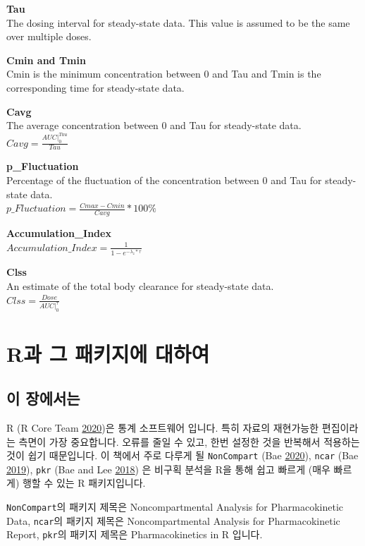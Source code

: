 \documentclass[
  12pt,
]{krantz}
\begin{document}
\textbf{Tau}\\
The dosing interval for steady-state data. This value is assumed to be the same over multiple doses.

\textbf{Cmin and Tmin}\\
Cmin is the minimum concentration between 0 and Tau and Tmin is the corresponding time for steady-state data.

\textbf{Cavg}\\
The average concentration between 0 and Tau for steady-state data.\\
\(Cavg = \frac{AUC|_{0}^{Tau}}{Tau}\)

\textbf{p\_Fluctuation}\\
Percentage of the fluctuation of the concentration between 0 and Tau for steady-state data.\\
\(p\_Fluctuation = \frac{Cmax-Cmin}{Cavg}*100\%\)

\textbf{Accumulation\_Index}\\
\(Accumulation\_Index = \frac{1}{1-e^{-\lambda_{z}*\tau}}\)

\textbf{Clss}\\
An estimate of the total body clearance for steady-state data.\\
\(Clss = \frac{Dose}{AUC|_{0}^{\tau}}\)

\hypertarget{R-and-packages}{%
\chapter{R과 그 패키지에 대하여}\label{R-and-packages}}

\hypertarget{summary-r-packages}{%
\section{이 장에서는}\label{summary-r-packages}}

R (R Core Team \protect\hyperlink{ref-R-base}{2020})은 통계 소프트웨어 입니다.
특히 자료의 재현가능한 편집이라는 측면이 가장 중요합니다. 오류를 줄일 수 있고, 한번 설정한 것을 반복해서 적용하는 것이 쉽기 때문입니다.
이 책에서 주로 다루게 될 \texttt{NonCompart} (Bae \protect\hyperlink{ref-R-NonCompart}{2020}), \texttt{ncar} (Bae \protect\hyperlink{ref-R-ncar}{2019}), \texttt{pkr} (Bae and Lee \protect\hyperlink{ref-R-pkr}{2018}) 은 비구획 분석을 R을 통해 쉽고 빠르게 (매우 빠르게) 행할 수 있는 R 패키지입니다.

\texttt{NonCompart}의 패키지 제목은 Noncompartmental Analysis for Pharmacokinetic Data,
\texttt{ncar}의 패키지 제목은 Noncompartmental Analysis for Pharmacokinetic Report,
\texttt{pkr}의 패키지 제목은 Pharmacokinetics in R 입니다.
\end{document}
